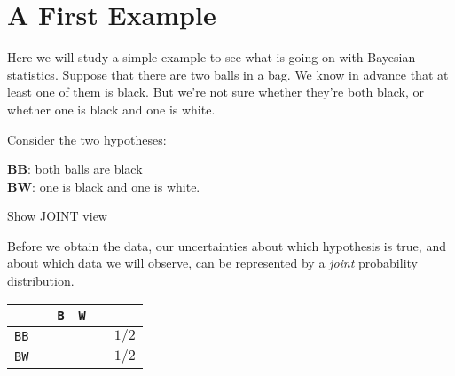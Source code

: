 \chapter{A First Example}

Here we will study a simple example to see what is going on with Bayesian
statistics. Suppose that there are two balls in a bag. We know in advance
that at least one of them is black. But we're not sure whether they're both
black, or whether one is black and one is white.

Consider the two hypotheses:

{\bf BB}: both balls are black\\
{\bf BW}: one is black and one is white.



Show JOINT view

Before we obtain the data, our uncertainties about which hypothesis is true,
and about which data we will observe, can be represented by a {\it joint}
probability distribution.

\begin{table}
\begin{center}
\begin{tabular}{cccccc}
 & \vline & {\tt B} & {\tt W} & \vline & \\
\hline
{\tt BB} & \vline & & & \vline & $1/2$\\
{\tt BW} & \vline & & & \vline & $1/2$\\
\hline
\end{tabular}
\end{center}
\end{table}
